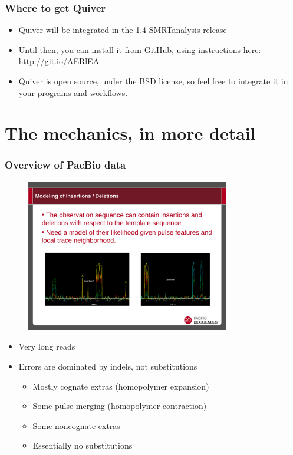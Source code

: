 \documentclass[serif,11pt]{beamer}
\begin{document}
\begin{frame}
\frametitle{Where to get Quiver}
\label{sec-1-3}

\begin{itemize}
\item Quiver will be integrated in the 1.4 SMRTanalysis release
\item Until then, you can install it from GitHub, using instructions
     here: \href{http://git.io/AERlEA}{http://git.io/AERlEA}
\item Quiver is open source, under the BSD license, so feel free to
     integrate it in your programs and workflows.
\end{itemize}
\end{frame}
\section{The mechanics, in more detail}
\label{sec-2}
\begin{frame}
\frametitle{Overview of PacBio data}
\label{sec-2-1}

   \begin{figure}
   \centering
     \includegraphics[width=3.5in]{img/traces}
   \end{figure}

\begin{itemize}
\item Very long reads
\item Errors are dominated by indels, not substitutions
\begin{itemize}
\item Mostly cognate extras (homopolymer expansion)
\item Some pulse merging (homopolymer contraction)
\item Some noncognate extras
\item Essentially no substitutions
\end{itemize}
\end{itemize}
\end{frame}
\end{document}
